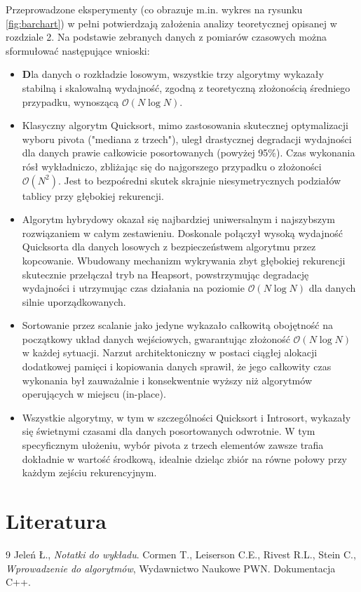 \documentclass[12pt, a4paper]{article}
\begin{document}
Przeprowadzone eksperymenty (co obrazuje m.in. wykres na rysunku \ref{fig:barchart}) w pełni potwierdzają założenia analizy teoretycznej opisanej w rozdziale 2. Na podstawie zebranych danych z pomiarów czasowych można sformułować następujące wnioski:

\begin{itemize}
    \item \textbf Dla danych o rozkładzie losowym, wszystkie trzy algorytmy wykazały stabilną i skalowalną wydajność, zgodną z teoretyczną złożonością średniego przypadku, wynoszącą $\mathcal{O}(N\log{N})$.
    \item Klasyczny algorytm Quicksort, mimo zastosowania skutecznej optymalizacji wyboru pivota ("mediana z trzech"), uległ drastycznej degradacji wydajności dla danych prawie całkowicie posortowanych (powyżej 95\%). Czas wykonania rósł wykładniczo, zbliżając się do najgorszego przypadku o złożoności $\mathcal{O}(N^2)$. Jest to bezpośredni skutek skrajnie niesymetrycznych podziałów tablicy przy głębokiej rekurencji.
    \item Algorytm hybrydowy okazał się najbardziej uniwersalnym i najszybszym rozwiązaniem w całym zestawieniu. Doskonale połączył wysoką wydajność Quicksorta dla danych losowych z bezpieczeństwem algorytmu przez kopcowanie. Wbudowany mechanizm wykrywania zbyt głębokiej rekurencji skutecznie przełączał tryb na Heapsort, powstrzymując degradację wydajności i utrzymując czas działania na poziomie $\mathcal{O}(N\log{N})$ dla danych silnie uporządkowanych.
    \item Sortowanie przez scalanie jako jedyne wykazało całkowitą obojętność na początkowy układ danych wejściowych, gwarantując złożoność $\mathcal{O}(N\log{N})$ w każdej sytuacji. Narzut architektoniczny w postaci ciągłej alokacji dodatkowej pamięci i kopiowania danych sprawił, że jego całkowity czas wykonania był zauważalnie i konsekwentnie wyższy niż algorytmów operujących w miejscu (in-place).
    \item Wszystkie algorytmy, w tym w szczególności Quicksort i Introsort, wykazały się świetnymi czasami dla danych posortowanych odwrotnie. W tym specyficznym ułożeniu, wybór pivota z trzech elementów zawsze trafia dokładnie w wartość środkową, idealnie dzieląc zbiór na równe połowy przy każdym zejściu rekurencyjnym.
\end{itemize}

\section{Literatura}
\begin{thebibliography}{9}
     Jeleń Ł., \textit{Notatki do wykładu}. %
     Cormen T., Leiserson C.E., Rivest R.L., Stein C., \textit{Wprowadzenie do algorytmów}, Wydawnictwo Naukowe PWN. %
     Dokumentacja C++.
\end{thebibliography}
\end{document}
